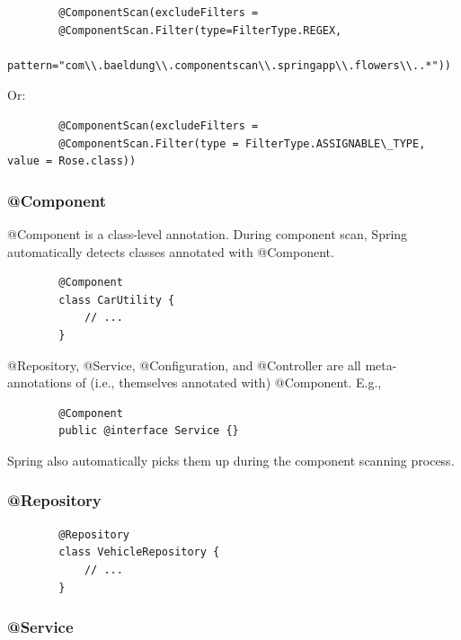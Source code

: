 \documentclass{scrartcl}
\begin{document}
    \begin{lstlisting}
        @ComponentScan(excludeFilters =
        @ComponentScan.Filter(type=FilterType.REGEX,
        pattern="com\\.baeldung\\.componentscan\\.springapp\\.flowers\\..*"))
    \end{lstlisting}

    Or:
    \begin{lstlisting}
        @ComponentScan(excludeFilters =
        @ComponentScan.Filter(type = FilterType.ASSIGNABLE\_TYPE, value = Rose.class))
    \end{lstlisting}

\subsubsection{@Component}

    @Component is a class-level annotation. During component scan, Spring automatically detects classes annotated with @Component.

    \begin{lstlisting}
        @Component
        class CarUtility {
            // ...
        }
    \end{lstlisting}

    @Repository, @Service, @Configuration, and @Controller are all meta-annotations of (i.e., themselves annotated with) @Component. E.g.,

      \begin{lstlisting}
        @Component
        public @interface Service {}
    \end{lstlisting}

    Spring also automatically picks them up during the component scanning process.


\subsubsection{@Repository}

    \begin{lstlisting}
        @Repository
        class VehicleRepository {
            // ...
        }
    \end{lstlisting}

\subsubsection{@Service}
\end{document}
